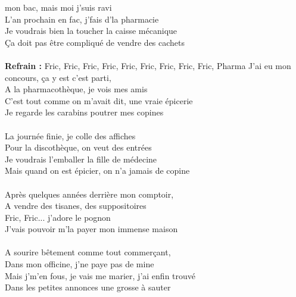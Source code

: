 
 mon bac, mais moi j'suis ravi
\\L'an prochain en fac, j'fais d'la pharmacie
\\Je voudrais bien la toucher la caisse mécanique
\\Ça doit pas être compliqué de vendre des cachets
\\\\\textbf{Refrain :}
{Fric, Fric, Fric, Fric, Fric, Fric, Fric, Fric, Fric, Pharma }
J'ai eu mon concours, ça y est c'est parti,
\\A la pharmacothèque, je vois mes amis
\\C'est tout comme on m'avait dit, une vraie épicerie
\\Je regarde les carabins poutrer mes copines
\\\\La journée finie, je colle des affiches
\\Pour la discothèque, on veut des entrées
\\Je voudrais l'emballer la fille de médecine
\\Mais quand on est épicier, on n'a jamais de copine
\\\\Après quelques années derrière mon comptoir,
\\A vendre des tisanes, des suppositoires
\\Fric, Fric... j'adore le pognon
\\J'vais pouvoir m'la payer mon immense maison
\\\\A sourire bêtement comme tout commerçant,
\\Dans mon officine, j'ne paye pas de mine
\\Mais j'm'en fous, je vais me marier, j'ai enfin trouvé
\\Dans les petites annonces une grosse à sauter
\breakpage